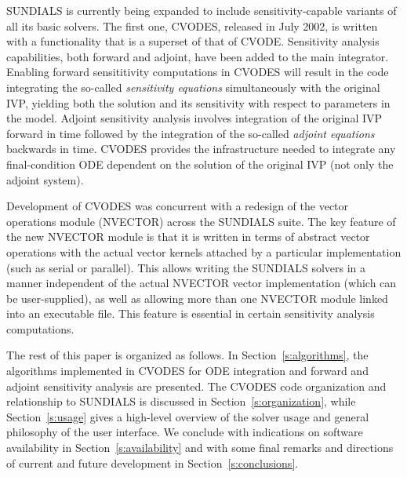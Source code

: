 SUNDIALS is currently being expanded to include sensitivity-capable variants of all
its basic solvers. The first one, CVODES, released in July 2002, 
is written with a functionality that is a superset of that of CVODE. 
Sensitivity analysis capabilities, both forward and adjoint, have been added to 
the main integrator. Enabling forward sensititivity computations 
in CVODES will result in the code integrating the so-called 
{\em sensitivity equations} simultaneously with the original IVP, 
yielding both the solution and its sensitivity with respect to parameters in the model. 
Adjoint sensitivity analysis involves integration of the 
original IVP forward in time followed by the integration of the so-called 
{\em adjoint equations} backwards in time. 
CVODES provides the infrastructure needed to integrate any final-condition ODE
dependent on the solution of the original IVP (not only the adjoint system). 

Development of CVODES was concurrent with a redesign of the vector operations module 
(NVECTOR) across the SUNDIALS suite. The key feature of the new NVECTOR module is that it
is written in terms of abstract vector operations with the actual vector kernels attached
by a particular implementation (such as serial or parallel). This allows
writing the SUNDIALS solvers in a manner independent of the actual NVECTOR vector
implementation (which can be user-supplied), as well as allowing more than one 
NVECTOR module linked into an executable file. This feature is essential in certain
sensitivity analysis computations.

The rest of this paper is organized as follows. In Section~\ref{s:algorithms}, the
algorithms implemented in CVODES for ODE integration and forward and adjoint 
sensitivity analysis are presented. The CVODES code organization and relationship
to SUNDIALS is discussed in Section~\ref{s:organization}, while Section~\ref{s:usage}
gives a high-level overview of the solver usage and general
philosophy of the user interface. We conclude with indications on software availability
in Section~\ref{s:availability} and with some final remarks and directions
of current and future development in Section~\ref{s:conclusions}.
